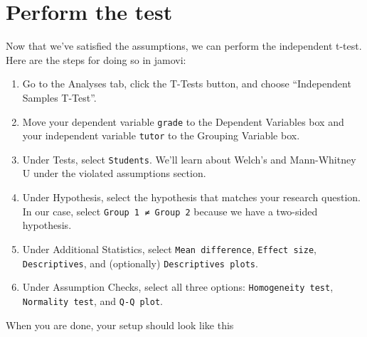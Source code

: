 \documentclass[
]{book}
\begin{document}
\hypertarget{perform-the-test}{%
\section{Perform the test}\label{perform-the-test}}

Now that we've satisfied the assumptions, we can perform the independent t-test. Here are the steps for doing so in jamovi:

\begin{enumerate}
\def\labelenumi{\arabic{enumi}.}
\item
  Go to the Analyses tab, click the T-Tests button, and choose ``Independent Samples T-Test''.
\item
  Move your dependent variable \texttt{grade} to the Dependent Variables box and your independent variable \texttt{tutor} to the Grouping Variable box.
\item
  Under Tests, select \texttt{Student\textquotesingle{}s}. We'll learn about Welch's and Mann-Whitney U under the violated assumptions section.
\item
  Under Hypothesis, select the hypothesis that matches your research question. In our case, select \texttt{Group\ 1\ ≠\ Group\ 2} because we have a two-sided hypothesis.
\item
  Under Additional Statistics, select \texttt{Mean\ difference}, \texttt{Effect\ size}, \texttt{Descriptives}, and (optionally) \texttt{Descriptives\ plots}.
\item
  Under Assumption Checks, select all three options: \texttt{Homogeneity\ test}, \texttt{Normality\ test}, and \texttt{Q-Q\ plot}.
\end{enumerate}

When you are done, your setup should look like this
\end{document}
